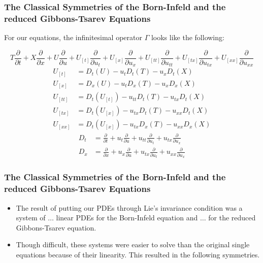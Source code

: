 \documentclass{beamer}
\begin{document}
\begin{frame}
    \frametitle{The Classical Symmetries of the Born-Infeld and the reduced Gibbons-Tsarev Equations}
        For our equations, the infinitesimal operator $\Gamma$ looks like the following:
        \vspace*{0.125in}
        \begin{small}
            $$T\frac{\partial}{\partial t} + X\frac{\partial}{\partial x} + U\frac{\partial}{\partial u} + U_{[t]}\frac{\partial}{\partial u_t} + U_{[x]}\frac{\partial}{\partial u_x} + U_{[tt]}\frac{\partial}{\partial u_{tt}} + U_{[tx]}\frac{\partial}{\partial u_{tx}} + U_{[xx]}\frac{\partial}{\partial u_{xx}}$$
            \begin{align*}
                U_{[t]} &= D_t(U)-u_tD_t(T)-u_xD_t(X) \\
                U_{[x]} &= D_x(U)-u_tD_x(T)-u_xD_x(X) \\
                U_{[tt]} &= D_t(U_{[t]})-u_{tt}D_t(T)-u_{tx}D_t(X) \\
                U_{[tx]} &= D_t(U_{[x]})-u_{tx}D_t(T)-u_{xx}D_t(X) \\
                U_{[xx]} &= D_t(U_{[x]})-u_{tx}D_x(T)-u_{xx}D_x(X)
            \end{align*}
            \begin{align*}
                D_t &= \frac{\partial}{\partial t} + u_t\frac{\partial}{\partial u} + u_{tt}\frac{\partial}{\partial u_t} + u_{tx}\frac{\partial}{\partial u_x} \\
                D_x &= \frac{\partial}{\partial x} + u_x\frac{\partial}{\partial u} + u_{tx}\frac{\partial}{\partial u_t} + u_{xx}\frac{\partial}{\partial u_x}
            \end{align*}
        \end{small}
    \end{frame}


\begin{frame}
    \frametitle{The Classical Symmetries of the Born-Infeld and the reduced Gibbons-Tsarev Equations}
        \begin{itemize}
            \item The result of putting our PDEs through Lie's invariance condition was a system of $\dots$ linear PDEs for the Born-Infeld equation and $\dots$ for the reduced Gibbons-Tsarev equation. \pause
            \item Though difficult, these systems were easier to solve than the original single equations because of their linearity. This resulted in the following symmetries.
        \end{itemize}
\end{frame}
\end{document}
